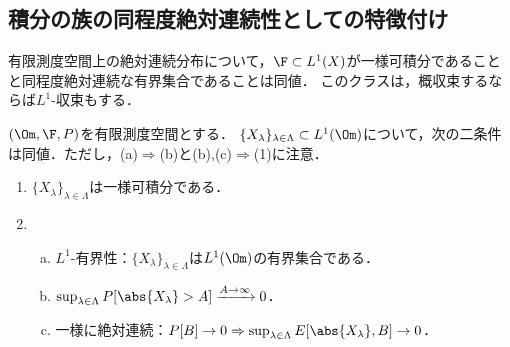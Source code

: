 \documentclass[uplatex,dvipdfmx]{jsreport}
\begin{document}
\subsection{積分の族の同程度絶対連続性としての特徴付け}

\begin{tcolorbox}[colframe=ForestGreen, colback=ForestGreen!10!white,breakable,colbacktitle=ForestGreen!40!white,coltitle=black,fonttitle=\bfseries\sffamily,
title=]
    有限測度空間上の絶対連続分布について，$\F\subset L^1(X)$が一様可積分であることと同程度絶対連続な有界集合であることは同値．
    このクラスは，概収束するならば$L^1$-収束もする．
\end{tcolorbox}

\begin{theorem}[一様可積分性の特徴付け]
    $(\Om,\F,P)$を有限測度空間とする．
    $\{X_\lambda\}_{\lambda\in\Lambda}\subset L^1(\Om)$について，次の二条件は同値．ただし，(a)$\Rightarrow$(b)と(b),(c)$\Rightarrow$(1)に注意．
    \begin{enumerate}
        \item $\{X_\lambda\}_{\lambda\in\Lambda}$は一様可積分である．
        \item \begin{enumerate}[(a)]
            \item $L^1$-有界性：$\{X_\lambda\}_{\lambda\in\Lambda}$は$L^1(\Om)$の有界集合である．
            \item $\sup_{\lambda\in\Lambda}P[\abs{X_\lambda}>A]\xrightarrow{A\to\infty}0$．
            \item 一様に絶対連続：$P[B]\to0\Rightarrow\sup_{\lambda\in\Lambda}E[\abs{X_\lambda},B]\to0$．
        \end{enumerate}
    \end{enumerate}
\end{theorem}
\end{document}

